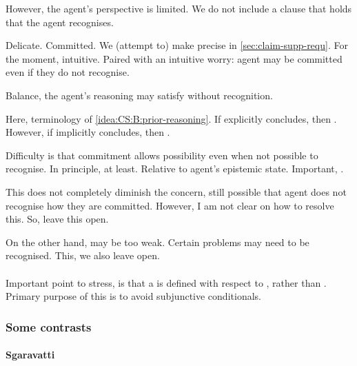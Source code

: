 \begin{note}
  However, the agent's perspective is limited.
  We do not include a clause that holds that the agent recognises.

  Delicate.
  Committed.
  We (attempt to) make precise in \autoref{sec:claim-supp-requ}.
  For the moment, intuitive.
  Paired with an intuitive worry: agent may be committed even if they do not recognise.

  Balance, the agent's reasoning may satisfy without recognition.

  Here,  terminology of \ref{idea:CS:B:prior-reasoning}.
  If explicitly concludes, then .
  However, if implicitly concludes, then .

  Difficulty is that commitment allows possibility even when not possible to recognise.
  In principle, at least.
  Relative to agent's epistemic state.
  Important, \ep{}.

  This does not completely diminish the concern, still possible that agent does not recognise how they are committed.
  However, I am not clear on how to resolve this.
  So, leave this open.

  On the other hand,  may be too weak.
  Certain problems may need to be recognised.
  This, we also leave open.
\end{note}

\paragraph{}

\begin{note}
  Important point to stress, is that a \requ{} is defined with respect to \epVAd{} , rather than \epPAd{} .
  Primary purpose of this is to avoid subjunctive conditionals.
\end{note}

\subsubsection{Some contrasts}
\label{sec:some-contrasts}

\paragraph{Sgaravatti}


